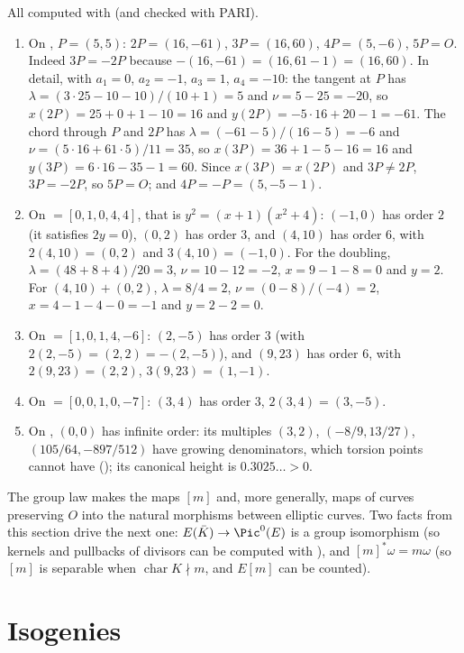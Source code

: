 \begin{example}\label{ex:ellcurves:torsion-points}
All computed with  (and checked with PARI).
\begin{enumerate}[label=(\alph*)]
\item On , $P=(5,5)$: $2P=(16,-61)$, $3P=(16,60)$, $4P=(5,-6)$, $5P=O$. Indeed $3P=-2P$ because $-(16,-61)=(16,61-1)=(16,60)$.
In detail, with $a_1=0$, $a_2=-1$, $a_3=1$, $a_4=-10$: the tangent at $P$ has $\lambda=(3\cdot25-10-10)/(10+1)=5$ and $\nu=5-25=-20$, so
$x(2P)=25+0+1-10=16$ and $y(2P)=-5\cdot16+20-1=-61$. The chord through $P$ and $2P$ has $\lambda=(-61-5)/(16-5)=-6$ and
$\nu=(5\cdot16+61\cdot5)/11=35$, so $x(3P)=36+1-5-16=16$ and $y(3P)=6\cdot16-35-1=60$. Since $x(3P)=x(2P)$ and $3P\ne2P$, $3P=-2P$, so $5P=O$; and $4P=-P=(5,-5-1)$.
\item On  $=[0,1,0,4,4]$, that is $y^2=(x+1)(x^2+4)$: $(-1,0)$ has order $2$ (it satisfies $2y=0$), $(0,2)$ has order $3$, and $(4,10)$ has order $6$, with $2(4,10)=(0,2)$ and
$3(4,10)=(-1,0)$. For the doubling, $\lambda=(48+8+4)/20=3$, $\nu=10-12=-2$, $x=9-1-8=0$ and $y=2$. For $(4,10)+(0,2)$, $\lambda=8/4=2$, $\nu=(0-8)/(-4)=2$,
$x=4-1-4-0=-1$ and $y=2-2=0$.
\item On  $=[1,0,1,4,-6]$: $(2,-5)$ has order $3$ (with $2(2,-5)=(2,2)=-(2,-5)$), and $(9,23)$ has order $6$, with $2(9,23)=(2,2)$, $3(9,23)=(1,-1)$.
\item On  $=[0,0,1,0,-7]$: $(3,4)$ has order $3$, $2(3,4)=(3,-5)$.
\item On , $(0,0)$ has infinite order: its multiples $(3,2)$, $(-8/9,13/27)$, $(105/64,-897/512)$ have growing denominators, which
torsion points cannot have (); its canonical height is $0.3025\ldots>0$.
\end{enumerate}
\end{example}

\noindent The group law makes the maps $[m]$ and, more generally, maps of curves preserving $O$ into the natural morphisms between elliptic curves. Two facts from this
section drive the next one: $E(\bar K)\to\Pic^0(E)$ is a group isomorphism (so kernels and pullbacks of divisors can be computed with ), and
$[m]^*\omega=m\omega$ (so $[m]$ is separable when $\operatorname{char}K\nmid m$, and $E[m]$ can be counted).
\section{Isogenies}\label{sec:ellcurves:isogenies}

